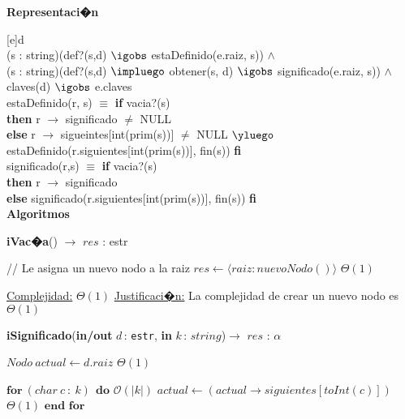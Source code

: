 \documentclass[a4paper,10pt]{article}
\let\TipoVariable=\texttt
\let\ModificadorArgumento=\textbf
\newcommand{\tab}{\hspace*{7mm}}
\newcommand{\ttab}{\tab \tab}
\newcommand{\In}[2]{\ModificadorArgumento{in} \ensuremath{#1}\,: \TipoVariable{#2}\xspace}
\newcommand{\Inout}[2]{\ModificadorArgumento{in/out} \ensuremath{#1}\,: \TipoVariable{#2}\xspace}
\newenvironment{Representacion}{%
  \vspace*{2ex}%
  \noindent\textbf{\Large Representaci�n}%
  \vspace*{2ex}%
}{}
\newenvironment{Algoritmos}{%
  \vspace*{2ex}%
  \noindent\textbf{\Large Algoritmos}%
  \vspace*{2ex}%
}{}
\newcommand{\DRef}{\ensuremath{\rightarrow}}
\newcommand{\BigO}{\ensuremath{\mathcal{O}}}
\newcommand{\tuple}[1]{\langle #1 \rangle}
\begin{document}
{\begin{Representacion}
    [e]{d}{ \\
      (\paratodo s : string)(def?(s,d) $\igobs$ estaDefinido(e.raiz, s)) $\land$ \\
      (\paratodo s : string)(def?(s,d) $\impluego$ obtener(s, d) $\igobs$ significado(e.raiz, s)) $\land$ \\
      claves(d) $\igobs$ e.claves}\\ 
    
    estaDefinido(r, s) $\equiv$ 
    \textbf{if} vacia?(s) \\
    \ttab \textbf{then} r $\DRef$ significado $\neq$ NULL \\ 
    \ttab \textbf{else} r $\DRef$ sigueintes[int(prim(s))] $\neq$ NULL $\yluego$ estaDefinido(r.siguientes[int(prim(s))], fin(s)) 
    \textbf{fi} \\

    significado(r,s)  $\equiv$ 
    \textbf{if} vacia?(s) \\
    \ttab \textbf{then} r $\DRef$ significado \\ 
    \ttab \textbf{else} significado(r.siguientes[int(prim(s))], fin(s)) 
    \textbf{fi} \\

  \end{Representacion}
  \begin{Algoritmos}

    \begin{algorithm}[H]{\textbf{iVac�a}() $\to$ $res$ : estr}
      \begin{algorithmic}[1]
           \State // Le asigna un nuevo nodo a la raiz
           \State $res \gets \tuple{raiz: nuevoNodo()}$				\Comment $\Theta(1)$
    
          \medskip
          \Statex \underline{Complejidad:} $\Theta(1)$
          \Statex \underline{Justificaci�n:} La complejidad de crear un nuevo nodo es $\Theta(1)$
          \end{algorithmic}
    \end{algorithm}

    \begin{algorithm}[H]{\textbf{iSignificado}(\Inout{d}{estr}, \In{k}{$string$})$\to$ $res$ : $\alpha$}
      \begin{algorithmic}[1]
        \State $Nodo \ actual \gets d.raiz$                                                      \Comment $\Theta(1)$

        \State $\textbf{for} \ (char \ c \ : \ k) \ \ \textbf{do}$                               \Comment $\BigO(|k|)$  
        \State \tab $actual \gets (actual \DRef siguientes [toInt(c)])$       \Comment $\Theta(1)$
        \State $\textbf{end for}$                                    


\end{algorithmic}
\end{algorithm}
\end{Algoritmos}}
\end{document}
